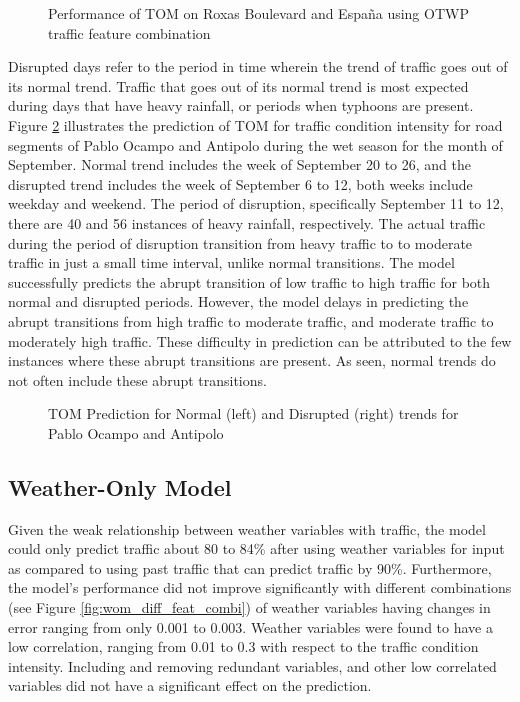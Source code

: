 \begin{figure}[h]
  \centering
  \captionsetup{justification=centering}
  \caption{Performance of TOM on Roxas Boulevard and España using OTWP traffic feature combination}
  \label{fig:tom_feat_combi_road}
\end{figure}
 

Disrupted days refer to the period in time wherein the trend of traffic goes out of its normal trend. Traffic that goes out of its normal trend is most expected during days that have  heavy rainfall, or periods when typhoons are present. Figure \ref{fig:TOM_normal_disrption_pocampo_antipolo_wet} illustrates the prediction of TOM for traffic condition intensity for road segments of Pablo Ocampo and Antipolo during the wet season for the month of September. Normal trend includes the week of September 20 to 26, and the disrupted trend includes the week of September 6 to 12, both weeks include weekday and weekend. The period of disruption, specifically September 11 to 12, there are 40 and 56 instances of heavy rainfall, respectively. The actual traffic during the period of disruption transition from heavy traffic to to moderate traffic in just a small time interval, unlike normal transitions. The model successfully predicts the abrupt transition of low traffic to high traffic for both normal and disrupted periods. However, the model delays in predicting the abrupt transitions from high traffic to moderate traffic, and moderate traffic to moderately high traffic. These difficulty in prediction can be attributed to the few instances where these abrupt transitions are present. As seen, normal trends do not often include these abrupt transitions. 

\begin{figure}[h]
  \centering
  \captionsetup{justification=centering}
  \caption{TOM Prediction for Normal (left) and Disrupted (right) trends for Pablo Ocampo and Antipolo}
  \label{fig:TOM_normal_disrption_pocampo_antipolo_wet}
\end{figure}

\subsection{Weather-Only Model}
Given the weak relationship between weather variables with traffic, the model could only predict traffic about 80 to 84\% after using weather variables for input as compared to using past traffic that can predict traffic by 90\%. Furthermore, the model’s performance did not improve significantly with different combinations (see Figure \ref{fig:wom_diff_feat_combi}) of weather variables having changes in error ranging from only 0.001 to 0.003. Weather variables were found to have a low correlation, ranging from 0.01 to 0.3 with respect to the traffic condition intensity. Including and removing redundant variables, and other low correlated variables did not have a significant effect on the prediction. 

